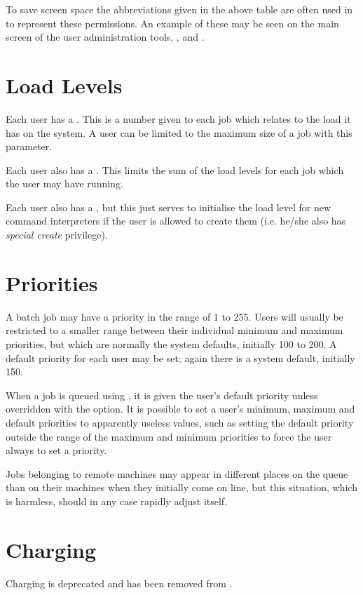 To save screen space the abbreviations given in the above table are often used in \ProductName{} to
represent these permissions. An example of these may be seen on the main screen of the user administration tools,
, \PrXbtuser{} and \PrXmbtuser{}.

\section{Load Levels}
\label{useradm:loadlevels}

Each user has a . This is a number given to each job which relates to the load it has on the system. A user can be limited to the maximum size of a job with this parameter.

Each user also has a . This limits the sum of the load levels for each job which the user may have running.

Each user also has a , but this just serves to initialise the load level for new command
interpreters if the user is allowed to create them (i.e. he/she also has \textit{special create} privilege).

\section{Priorities}
A batch job may have a priority in the range of 1 to 255. Users will usually be restricted to a smaller range between their individual
minimum and maximum priorities, but which are normally the system defaults, initially 100 to 200. A default priority for each user may be
set; again there is a system default, initially 150.

When a job is queued using \PrBtr{}, it is given the user's default priority unless overridden with the
 option. It is possible to set a user's minimum, maximum and default priorities to apparently useless values, such as
setting the default priority outside the range of the maximum and minimum priorities to force the user always to set a priority.

Jobs belonging to remote machines may appear in different places on the queue than on their machines when they initially come on line, but this
situation, which is harmless, should in any case rapidly adjust itself.

\section{Charging}
Charging is deprecated and has been removed from \ProductName{}.

